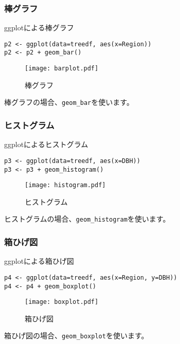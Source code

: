     \subsubsection{棒グラフ}
\begin{itembox}[l]{ggplotによる棒グラフ}
\begin{verbatim}
p2 <- ggplot(data=treedf, aes(x=Region))
p2 <- p2 + geom_bar()
\end{verbatim}
\end{itembox}
\begin{figure}[htb]
\begin{center}
\graphicspath{{1_basic/figs/}}
\texttt{[image: barplot.pdf]}\\
\caption{棒グラフ}
 \label{barplot}
\end{center}
\end{figure}
棒グラフの場合、\verb|geom_bar|を使います。

    \subsubsection{ヒストグラム}
\begin{itembox}[l]{ggplotによるヒストグラム}
\begin{verbatim}
p3 <- ggplot(data=treedf, aes(x=DBH))
p3 <- p3 + geom_histogram()
\end{verbatim}
\end{itembox}
\begin{figure}[htb]
\begin{center}
\graphicspath{{1_basic/figs/}}
\texttt{[image: histogram.pdf]}\\
\caption{ヒストグラム}
 \label{histogram}
\end{center}
\end{figure}
ヒストグラムの場合、\verb|geom_histogram|を使います。

    \subsubsection{箱ひげ図}
\begin{itembox}[l]{ggplotによる箱ひげ図}
\begin{verbatim}
p4 <- ggplot(data=treedf, aes(x=Region, y=DBH))
p4 <- p4 + geom_boxplot()
\end{verbatim}
\end{itembox}
\begin{figure}[htb]
\begin{center}
\graphicspath{{1_basic/figs/}}
\texttt{[image: boxplot.pdf]}\\
\caption{箱ひげ図}
 \label{boxplot}
\end{center}
\end{figure}
箱ひげ図の場合、\verb|geom_boxplot|を使います。

